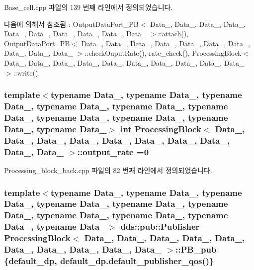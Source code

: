 Base\+\_\+cell.\+cpp 파일의 139 번째 라인에서 정의되었습니다.



다음에 의해서 참조됨 \+:  Output\+Data\+Port\+\_\+\+P\+B$<$ Data\+\_, Data\+\_, Data\+\_, Data\+\_, Data\+\_, Data\+\_, Data\+\_, Data\+\_, Data\+\_, Data\+\_ $>$\+::attach(), Output\+Data\+Port\+\_\+\+P\+B$<$ Data\+\_, Data\+\_, Data\+\_, Data\+\_, Data\+\_, Data\+\_, Data\+\_, Data\+\_, Data\+\_, Data\+\_ $>$\+::check\+Ouput\+Rate(), rate\+\_\+check(), Processing\+Block$<$ Data\+\_, Data\+\_, Data\+\_, Data\+\_, Data\+\_, Data\+\_, Data\+\_, Data\+\_, Data\+\_, Data\+\_ $>$\+::write().

\subsubsection[{\texorpdfstring{output\+\_\+rate}{output_rate}}]{\setlength{\rightskip}{0pt plus 5cm}template$<$typename Data\+\_, typename Data\+\_, typename Data\+\_, typename Data\+\_, typename Data\+\_, typename Data\+\_, typename Data\+\_, typename Data\+\_, typename Data\+\_, typename Data\+\_$>$ int {\bf Processing\+Block}$<$ Data\+\_, Data\+\_, Data\+\_, Data\+\_, Data\+\_, Data\+\_, Data\+\_, Data\+\_, Data\+\_, Data\+\_ $>$\+::output\+\_\+rate =0}\hypertarget{classProcessingBlock_a58e03ff6647a5e2aa7fa96ff74652ed8}{}\label{classProcessingBlock_a58e03ff6647a5e2aa7fa96ff74652ed8}


Processing\+\_\+block\+\_\+back.\+cpp 파일의 82 번째 라인에서 정의되었습니다.

\subsubsection[{\texorpdfstring{P\+B\+\_\+pub}{PB_pub}}]{\setlength{\rightskip}{0pt plus 5cm}template$<$typename Data\+\_, typename Data\+\_, typename Data\+\_, typename Data\+\_, typename Data\+\_, typename Data\+\_, typename Data\+\_, typename Data\+\_, typename Data\+\_, typename Data\+\_$>$ dds\+::pub\+::\+Publisher {\bf Processing\+Block}$<$ Data\+\_, Data\+\_, Data\+\_, Data\+\_, Data\+\_, Data\+\_, Data\+\_, Data\+\_, Data\+\_, Data\+\_ $>$\+::P\+B\+\_\+pub \{{\bf default\+\_\+dp}, default\+\_\+dp.\+default\+\_\+publisher\+\_\+qos()\}}\hypertarget{classProcessingBlock_aed99bbdd5010b92144f60073869e5589}{}\label{classProcessingBlock_aed99bbdd5010b92144f60073869e5589}


